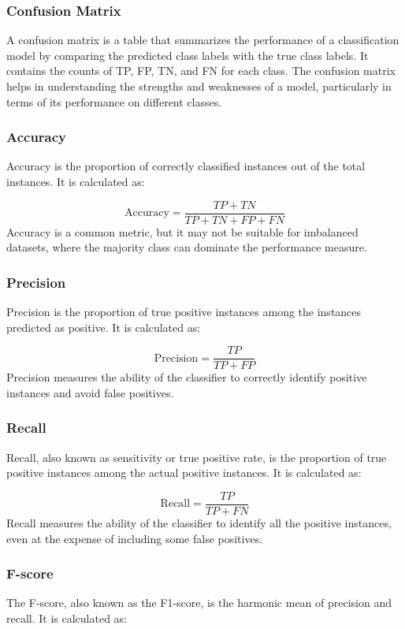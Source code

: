 \documentclass[12pt]{article}
\begin{document}
\subsubsection{Confusion Matrix}

A confusion matrix is a table that summarizes the performance of a classification model by comparing the predicted class labels with the true class labels. It contains the counts of TP, FP, TN, and FN for each class. The confusion matrix helps in understanding the strengths and weaknesses of a model, particularly in terms of its performance on different classes.

\subsubsection{Accuracy}

Accuracy is the proportion of correctly classified instances out of the total instances. It is calculated as:

$$\text{Accuracy} = \frac{TP + TN}{TP + TN + FP + FN}$$
Accuracy is a common metric, but it may not be suitable for imbalanced datasets, where the majority class can dominate the performance measure.

\subsubsection{Precision}

Precision is the proportion of true positive instances among the instances predicted as positive. It is calculated as:

$$\text{Precision} = \frac{TP}{TP + FP}$$
Precision measures the ability of the classifier to correctly identify positive instances and avoid false positives.

\subsubsection{Recall}
Recall, also known as sensitivity or true positive rate, is the proportion of true positive instances among the actual positive instances. It is calculated as:

$$\text{Recall} = \frac{TP}{TP + FN}$$
Recall measures the ability of the classifier to identify all the positive instances, even at the expense of including some false positives.

\subsubsection{F-score}
The F-score, also known as the F1-score, is the harmonic mean of precision and recall. It is calculated as:
\end{document}
